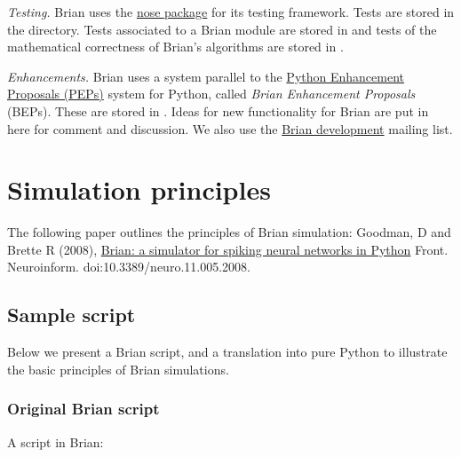\documentclass[letterpaper,10pt,english]{manual}
\begin{document}
\emph{Testing.}
Brian uses the \href{http://somethingaboutorange.com/mrl/projects/nose/0.11.1/}{nose package}
for its testing framework. Tests are stored in the  directory.
Tests associated to a Brian module are stored in 
and tests of the mathematical correctness of Brian's algorithms are stored in
.

\emph{Enhancements.}
Brian uses a system parallel to the
\href{http://www.python.org/dev/peps/}{Python Enhancement Proposals (PEPs)} system
for Python, called \emph{Brian Enhancement Proposals} (BEPs). These are stored in
. Ideas for new functionality for Brian are put in here for comment
and discussion. We also use the \href{http://groups.google.fr/group/brian-development}{Brian development}
mailing list.

\resetcurrentobjects
\hypertarget{--doc-developer-simulationprinciples}{}

\section{Simulation principles}

The following paper outlines the principles of Brian simulation: Goodman, D and
Brette R (2008),
\href{http://www.frontiersin.org/neuroinformatics/paper/10.3389/neuro.11/005.2008/}{Brian: a simulator for spiking neural networks in Python}
Front. Neuroinform. doi:10.3389/neuro.11.005.2008.


\subsection{Sample script}

Below we present a Brian script, and a translation into pure Python to
illustrate the basic principles of Brian simulations.


\subsubsection{Original Brian script}

A script in Brian:
\end{document}
